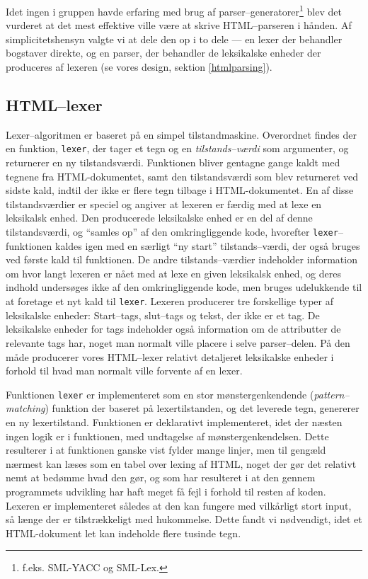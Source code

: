 \documentclass[a4paper,oneside]{memoir}
\begin{document}
Idet ingen i gruppen havde erfaring med brug af
parser--generatorer\footnote{f.eks. SML-YACC og SML-Lex.}
blev det vurderet at det mest effektive ville være at skrive
HTML--parseren i hånden. Af simplicitetshensyn valgte vi at dele den
op i to dele --- en lexer der behandler bogstaver direkte, og en
parser, der behandler de leksikalske enheder der produceres af lexeren
(se vores design, sektion \ref{htmlparsing}).

\subsection{HTML--lexer}
\label{htmllexerimpl}
Lexer--algoritmen er baseret på en simpel tilstandmaskine. Overordnet
findes der en funktion, \texttt{lexer}, der tager et tegn og en
\textit{tilstands--værdi} som argumenter, og returnerer en ny
tilstandsværdi. Funktionen bliver gentagne gange kaldt med tegnene fra
HTML-dokumentet, samt den tilstandsværdi som blev returneret ved
sidste kald, indtil der ikke er flere tegn tilbage i
HTML-dokumentet. En af disse tilstandsværdier er speciel og angiver at
lexeren er færdig med at lexe en leksikalsk enhed. Den producerede
leksikalske enhed er en del af denne tilstandsværdi, og ``samles op''
af den omkringliggende kode, hvorefter \texttt{lexer}--funktionen
kaldes igen med en særligt ``ny start'' tilstands--værdi, der også
bruges ved første kald til funktionen. De andre tilstands--værdier
indeholder information om hvor langt lexeren er nået med at lexe en
given leksikalsk enhed, og deres indhold undersøges ikke af den
omkringliggende kode, men bruges udelukkende til at foretage et nyt
kald til \texttt{lexer}. Lexeren producerer tre forskellige typer af
leksikalske enheder: Start--tags, slut--tags og tekst, der ikke er et
tag. De leksikalske enheder for tags indeholder også information om de
attributter de relevante tags har, noget man normalt ville placere i
selve parser--delen. På den måde producerer vores HTML--lexer relativt
detaljeret leksikalske enheder i forhold til hvad man normalt ville
forvente af en lexer.

Funktionen \texttt{lexer} er implementeret som en stor
mønstergenkendende (\textit{pattern--matching}) funktion der baseret
på lexertilstanden, og det leverede tegn, genererer en ny
lexertilstand. Funktionen er deklarativt implementeret, idet der
næsten ingen logik er i funktionen, med undtagelse af
mønstergenkendelsen. Dette resulterer i at funktionen ganske vist
fylder mange linjer, men til gengæld nærmest kan læses som en tabel
over lexing af HTML, noget der gør det relativt nemt at bedømme hvad
den gør, og som har resulteret i at den gennem programmets udvikling
har haft meget få fejl i forhold til resten af koden. Lexeren er
implementeret således at den kan fungere med vilkårligt stort input,
så længe der er tilstrækkeligt med hukommelse. Dette fandt vi
nødvendigt, idet et HTML-dokument let kan indeholde flere tusinde
tegn.
\end{document}
